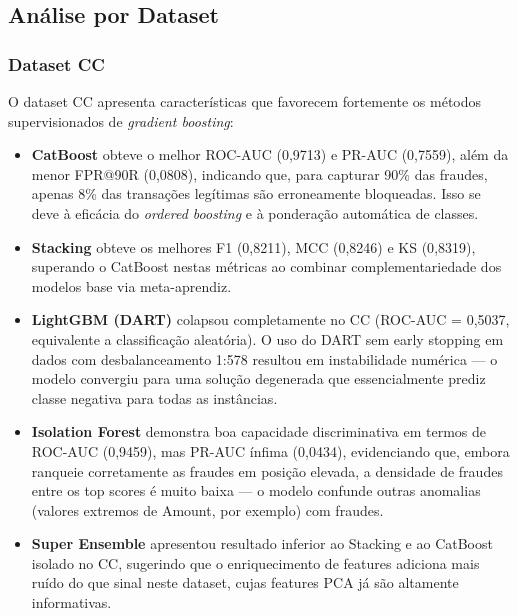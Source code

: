 \documentclass[12pt,a4paper]{article}
\begin{document}
\subsection{Análise por Dataset}
\label{sec:analise}

\subsubsection{Dataset CC}

O dataset CC apresenta características que favorecem fortemente os métodos
supervisionados de \textit{gradient boosting}:

\begin{itemize}[nosep]
  \item \textbf{CatBoost} obteve o melhor ROC-AUC (0{,}9713) e PR-AUC
    (0{,}7559), além da menor FPR@90R (0{,}0808), indicando que, para capturar
    90\% das fraudes, apenas 8\% das transações legítimas são erroneamente
    bloqueadas. Isso se deve à eficácia do \textit{ordered boosting} e à
    ponderação automática de classes.

  \item \textbf{Stacking} obteve os melhores F1 (0{,}8211), MCC (0{,}8246) e
    KS (0{,}8319), superando o CatBoost nestas métricas ao combinar
    complementariedade dos modelos base via meta-aprendiz.

  \item \textbf{LightGBM (DART)} colapsou completamente no CC (ROC-AUC =
    0{,}5037, equivalente a classificação aleatória). O uso do DART sem early
    stopping em dados com desbalanceamento 1:578 resultou em instabilidade
    numérica — o modelo convergiu para uma solução degenerada que essencialmente
    prediz classe negativa para todas as instâncias.

  \item \textbf{Isolation Forest} demonstra boa capacidade discriminativa em
    termos de ROC-AUC (0{,}9459), mas PR-AUC ínfima (0{,}0434), evidenciando
    que, embora ranqueie corretamente as fraudes em posição elevada, a densidade
    de fraudes entre os top scores é muito baixa — o modelo confunde outras
    anomalias (valores extremos de Amount, por exemplo) com fraudes.

  \item \textbf{Super Ensemble} apresentou resultado inferior ao Stacking e ao
    CatBoost isolado no CC, sugerindo que o enriquecimento de features adiciona
    mais ruído do que sinal neste dataset, cujas features PCA já são altamente
    informativas.
\end{itemize}
\end{document}

